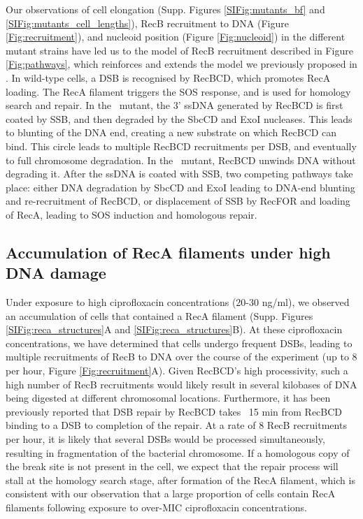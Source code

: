Our observations of cell elongation (Supp. Figures \ref{SIFig:mutants_bf} and \ref{SIFig:mutants_cell_lengths}), RecB recruitment to DNA (Figure \ref{Fig:recruitment}), and nucleoid position (Figure \ref{Fig:nucleoid}) in the different mutant strains have led us to the model of RecB recruitment described in Figure \ref{Fig:pathways}, which reinforces and extends the model we previously proposed in \cite{Lepore2023}. In wild-type cells, a DSB is recognised by RecBCD, which promotes RecA loading. The RecA filament triggers the SOS response, and is used for homology search and repair. In the \dreca\ mutant, the 3' ssDNA generated by RecBCD is first coated by SSB, and then degraded by the SbcCD and ExoI nucleases\cite{Zahradka2009}. This leads to blunting of the DNA end, creating a new substrate on which RecBCD can bind. This circle leads to multiple RecBCD recruitments per DSB, and eventually to full chromosome degradation. In the \geneteneighty\ mutant, RecBCD unwinds DNA without degrading it. After the ssDNA is coated with SSB, two competing pathways take place: either DNA degradation by SbcCD and ExoI leading to DNA-end blunting and re-recruitment of RecBCD, or displacement of SSB by RecFOR and loading of RecA, leading to SOS induction and homologous repair.

\subsection*{Accumulation of RecA filaments under high DNA damage}
Under exposure to high ciprofloxacin concentrations (20-30 ng/ml), we observed an accumulation of cells that contained a RecA filament (Supp. Figures \ref{SIFig:reca_structures}A and \ref{SIFig:reca_structures}B). At these ciprofloxacin concentrations, we have determined that cells undergo frequent DSBs, leading to multiple recruitments of RecB to DNA over the course of the experiment (up to 8 per hour, Figure \ref{Fig:recruitment}A). Given RecBCD's high processivity\cite{Wiktor2018}, such a high number of RecB recruitments would likely result in several kilobases of DNA being digested at different chromosomal locations. Furthermore, it has been previously reported that DSB repair by RecBCD takes ~15 min from RecBCD binding to a DSB to completion of the repair\cite{Wiktor2021}. At a rate of 8 RecB recruitments per hour, it is likely that several DSBs would be processed simultaneously, resulting in fragmentation of the bacterial chromosome. If a homologous copy of the break site is not present in the cell, we expect that the repair process will stall at the homology search stage, after formation of the RecA filament, which is consistent with our observation that a large proportion of cells contain RecA filaments following exposure to over-MIC ciprofloxacin concentrations.

